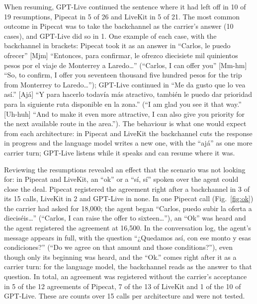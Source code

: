 \documentclass[11pt]{article}
\newcommand{\RIntAcuApoyoA}{3}
\newcommand{\RIntAcuApoyoB}{2}
\newcommand{\RIntAcuNoAceptadosA}{5}
\newcommand{\RIntAcuNoAceptadosB}{7}
\newcommand{\RIntAcuNoAceptadosC}{1}
\newcommand{\RIntAcuRegistradosA}{12}
\newcommand{\RIntAcuRegistradosB}{13}
\newcommand{\RIntAcuRegistradosC}{10}
\newcommand{\RIntLlamadasA}{15}
\newcommand{\RIntRetCA}{5}
\newcommand{\RIntRetCB}{5}
\newcommand{\RIntRetCC}{10}
\newcommand{\RIntRetTA}{10}
\newcommand{\RIntRetTC}{1}
\newcommand{\RIntRetTotalA}{26}
\newcommand{\RIntRetTotalB}{21}
\newcommand{\RIntRetTotalC}{19}
\newcommand{\RLtMonto}{16{,}500}
\begin{document}
When resuming, GPT-Live continued the sentence where it had left off in \RIntRetCC{} of
\RIntRetTotalC{} resumptions, Pipecat in \RIntRetCA{} of \RIntRetTotalA{} and LiveKit in
\RIntRetCB{} of \RIntRetTotalB. The most common outcome in Pipecat was to take the
backchannel as the carrier's answer (\RIntRetTA{} cases), and GPT-Live did so in
\RIntRetTC. One example of each case, with the backchannel in brackets: Pipecat took it
as an answer in ``Carlos, le puedo ofrecer'' [Mjm] ``Entonces, para confirmar, le
ofrezco diecisiete mil quinientos pesos por el viaje de Monterrey a Laredo\ldots''
(``Carlos, I can offer you'' [Mm-hm] ``So, to confirm, I offer you seventeen thousand
five hundred pesos for the trip from Monterrey to Laredo\ldots''); GPT-Live continued in
``Me da gusto que lo vea así.'' [Ajá] ``Y para hacerlo todavía más atractivo, también
le puedo dar prioridad para la siguiente ruta disponible en la zona.'' (``I am glad you
see it that way.'' [Uh-huh] ``And to make it even more attractive, I can also give you
priority for the next available route in the area.''). The behaviour is what one would
expect from each architecture: in Pipecat and LiveKit the backchannel cuts the
response in progress and the language model writes a new one, with the ``ajá'' as one
more carrier turn; GPT-Live listens while it speaks and can resume where it was.

Reviewing the resumptions revealed an effect that the scenario was not looking for: in
Pipecat and LiveKit, an ``ok'' or a ``sí, sí'' spoken over the agent could close the
deal. Pipecat registered the agreement right after a backchannel in \RIntAcuApoyoA{} of
its \RIntLlamadasA{} calls, LiveKit in \RIntAcuApoyoB{} and GPT-Live in none. In one Pipecat call
(Fig.~\ref{fig:ok}) the carrier had asked for 18,000; the agent began ``Carlos, puedo
subir la oferta a dieciséis\ldots'' (``Carlos, I can raise the offer to
sixteen\ldots''), an ``Ok'' was heard and the agent registered the agreement at
\RLtMonto. In the conversation log, the agent's message appears in full, with the
question ``¿Quedamos así, con ese monto y esas condiciones?'' (``Do we agree on that
amount and those conditions?''), even though only its beginning was heard, and the
``Ok.'' comes right after it as a carrier turn: for the language model, the backchannel
reads as the answer to that question. In total, an agreement was registered without
the carrier's acceptance in \RIntAcuNoAceptadosA{} of the \RIntAcuRegistradosA{}
agreements of Pipecat, \RIntAcuNoAceptadosB{} of the \RIntAcuRegistradosB{} of LiveKit and
\RIntAcuNoAceptadosC{} of the \RIntAcuRegistradosC{} of GPT-Live. These are counts over
\RIntLlamadasA{} calls per architecture and were not tested.
\end{document}
